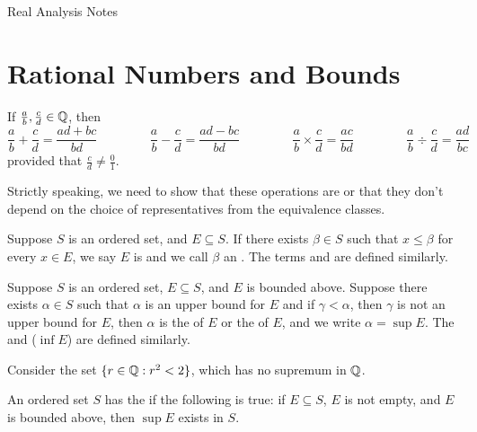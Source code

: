 \documentclass{mathnotes}
\begin{document}
\begin{center}
  \vspace*{20pt}
  \LARGE{Real Analysis Notes}
\end{center}

\section*{Rational Numbers and Bounds}

If $\frac{a}{b},\frac{c}{d}\in\mathbb{Q}$, then
$$\frac{a}{b}+\frac{c}{d}=\frac{ad+bc}{bd} \hspace{50pt}
\frac{a}{b}-\frac{c}{d}=\frac{ad-bc}{bd} \hspace{50pt}
\frac{a}{b}\times\frac{c}{d}=\frac{ac}{bd} \hspace{50pt}
\frac{a}{b}\div\frac{c}{d}=\frac{ad}{bc}$$
provided that $\frac{c}{d}\neq\frac{0}{1}$.\\

\begin{note}
  Strictly speaking, we need to show that these operations are
   or that they don't depend on the choice of
  representatives from the equivalence classes.
\end{note}

\begin{defi}
  Suppose $S$ is an ordered set, and $E\subseteq S$. If there exists $\beta\in
  S$ such that $x\leq \beta$ for every $x\in E$, we say $E$ is  and we call $\beta$ an . The terms  and  are defined similarly.
\end{defi}

\begin{defi}
  Suppose $S$ is an ordered set, $E\subseteq S$, and $E$ is bounded above.
  Suppose there exists $\alpha\in S$ such that $\alpha$ is an upper bound for
  $E$ and if $\gamma<\alpha$, then $\gamma$ is not an upper bound for $E$, then
  $\alpha$ is the  of $E$ or the  of
  $E$, and we write $\alpha=\sup{E}$. The  and
   ($\inf{E}$) are defined similarly.
\end{defi}

\begin{ex}
  Consider the set $\{r\in\mathbb{Q}:r^2<2\}$, which has no supremum in $\mathbb{Q}$.
\end{ex}

\begin{defi}
  An ordered set $S$ has the  if the
  following is true: if $E\subseteq S$, $E$ is not empty, and $E$ is bounded
  above, then $\sup{E}$ exists in $S$.
\end{defi}
\end{document}
